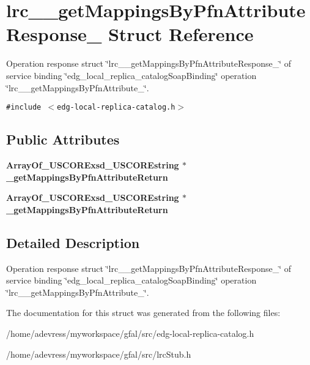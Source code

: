 \section{lrc\_\-\_\-get\-Mappings\-By\-Pfn\-Attribute\-Response\_\- Struct Reference}
\label{structlrc____getMappingsByPfnAttributeResponse__}
Operation response struct \char`\"{}lrc\_\-\_\-get\-Mappings\-By\-Pfn\-Attribute\-Response\_\-\char`\"{} of service binding \char`\"{}edg\_\-local\_\-replica\_\-catalog\-Soap\-Binding\char`\"{} operation \char`\"{}lrc\_\-\_\-get\-Mappings\-By\-Pfn\-Attribute\_\-\char`\"{}.  


{\tt \#include $<$edg-local-replica-catalog.h$>$}

\subsection*{Public Attributes}
\begin{CompactItemize}
\item 
\bf{Array\-Of\_\-USCORExsd\_\-USCOREstring} $\ast$ \textbf{\_\-get\-Mappings\-By\-Pfn\-Attribute\-Return}\label{structlrc____getMappingsByPfnAttributeResponse___7555c81f0cfb55a8835c4b3a66761d78}

\item 
\bf{Array\-Of\_\-USCORExsd\_\-USCOREstring} $\ast$ \textbf{\_\-get\-Mappings\-By\-Pfn\-Attribute\-Return}\label{structlrc____getMappingsByPfnAttributeResponse___7555c81f0cfb55a8835c4b3a66761d78}

\end{CompactItemize}


\subsection{Detailed Description}
Operation response struct \char`\"{}lrc\_\-\_\-get\-Mappings\-By\-Pfn\-Attribute\-Response\_\-\char`\"{} of service binding \char`\"{}edg\_\-local\_\-replica\_\-catalog\-Soap\-Binding\char`\"{} operation \char`\"{}lrc\_\-\_\-get\-Mappings\-By\-Pfn\-Attribute\_\-\char`\"{}. 



The documentation for this struct was generated from the following files:\begin{CompactItemize}
\item 
/home/adevress/myworkspace/gfal/src/edg-local-replica-catalog.h\item 
/home/adevress/myworkspace/gfal/src/lrc\-Stub.h\end{CompactItemize}
